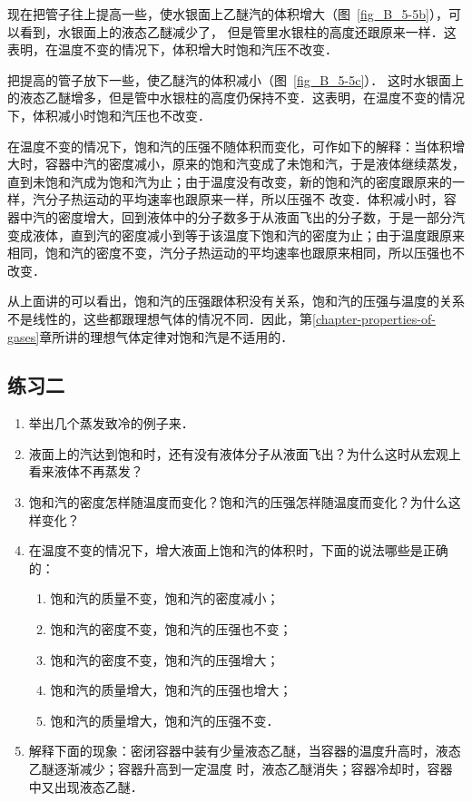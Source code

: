 现在把管子往上提高一些，使水银面上乙醚汽的体积增大（图~\ref{fig_B_5-5b}），可以看到，水银面上的液态乙醚减少了，
但是管里水银柱的高度还跟原来一样．这表明，在温度不变的情况下，体积增大时饱和汽压不改变．

把提高的管子放下一些，使乙醚汽的体积减小（图~\ref{fig_B_5-5c}）． 这时水银面上的液态乙醚增多，但是管中水银柱的高度仍保持不变．这表明，在温度不变的情况下，体积减小时饱和汽压也不改变．

在温度不变的情况下，饱和汽的压强不随体积而变化，可作如下的解释：当体积增大时，容器中汽的密度减小，原来的饱和汽变成了未饱和汽，于是液体继续蒸发，直到未饱和汽成为饱和汽为止；由于温度没有改变，新的饱和汽的密度跟原来的一样，汽分子热运动的平均速率也跟原来一样，所以压强不
改变．体积减小时，容器中汽的密度增大，回到液体中的分子数多于从液面飞出的分子数，于是一部分汽变成液体，直到汽的密度减小到等于该温度下饱和汽的密度为止；由于温度跟原来相同，饱和汽的密度不变，汽分子热运动的平均速率也跟原来相同，所以压强也不改变．

从上面讲的可以看出，饱和汽的压强跟体积没有关系，饱和汽的压强与温度的关系不是线性的，这些都跟理想气体的情况不同．因此，第\ref{chapter-properties-of-gases}章所讲的理想气体定律对饱和汽是不适用的．


\subsection*{练习二}

\begin{enumerate}
\item 举出几个蒸发致冷的例子来．
\item 液面上的汽达到饱和时，还有没有液体分子从液面飞出？为什么这时从宏观上看来液体不再蒸发？
\item 饱和汽的密度怎样随温度而变化？饱和汽的压强怎祥随温度而变化？为什么这样变化？
\item 在温度不变的情况下，增大液面上饱和汽的体积时，下面的说法哪些是正确的：
\begin{enumerate}
    \item 饱和汽的质量不变，饱和汽的密度减小；
    \item 饱和汽的密度不变，饱和汽的压强也不变；
    \item 饱和汽的密度不变，饱和汽的压强增大；
    \item 饱和汽的质量增大，饱和汽的压强也增大；
    \item 饱和汽的质量增大，饱和汽的压强不变．
\end{enumerate}

\item 解释下面的现象：密闭容器中装有少量液态乙醚，当容器的温度升高时，液态乙醚逐渐减少；容器升高到一定温度
时，液态乙醚消失；容器冷却时，容器中又出现液态乙醚．
\end{enumerate}

